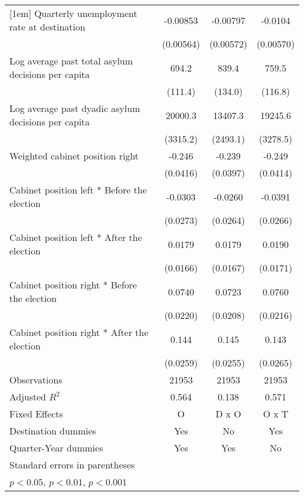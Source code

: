 \begin{table}[htbp]
\begin{tabular}{l*{3}{c}}
[1em]
Quarterly unemployment rate at destination&    -0.00853         &    -0.00797         &     -0.0104         \\
                    &   (0.00564)         &   (0.00572)         &   (0.00570)         \\
[1em]
Log average past total asylum decisions per capita&       694.2\sym{***}&       839.4\sym{***}&       759.5\sym{***}\\
                    &     (111.4)         &     (134.0)         &     (116.8)         \\
[1em]
Log average past dyadic asylum decisions per capita&     20000.3\sym{***}&     13407.3\sym{***}&     19245.6\sym{***}\\
                    &    (3315.2)         &    (2493.1)         &    (3278.5)         \\
[1em]
Weighted cabinet position right&      -0.246\sym{***}&      -0.239\sym{***}&      -0.249\sym{***}\\
                    &    (0.0416)         &    (0.0397)         &    (0.0414)         \\
[1em]
Cabinet position left * Before the election&     -0.0303         &     -0.0260         &     -0.0391         \\
                    &    (0.0273)         &    (0.0264)         &    (0.0266)         \\
[1em]
Cabinet position left * After the election&      0.0179         &      0.0179         &      0.0190         \\
                    &    (0.0166)         &    (0.0167)         &    (0.0171)         \\
[1em]
Cabinet position right * Before the election&      0.0740\sym{**} &      0.0723\sym{**} &      0.0760\sym{***}\\
                    &    (0.0220)         &    (0.0208)         &    (0.0216)         \\
[1em]
Cabinet position right * After the election&       0.144\sym{***}&       0.145\sym{***}&       0.143\sym{***}\\
                    &    (0.0259)         &    (0.0255)         &    (0.0265)         \\
\hline
Observations        &       21953         &       21953         &       21953         \\
Adjusted \(R^{2}\)  &       0.564         &       0.138         &       0.571         \\
Fixed Effects       &           O         &       D x O         &       O x T         \\
Destination dummies &         Yes         &          No         &         Yes         \\
Quarter-Year dummies&         Yes         &         Yes         &          No         \\
\hline\hline
\multicolumn{4}{l}{\footnotesize Standard errors in parentheses}\\
\multicolumn{4}{l}{\footnotesize \sym{*} \(p<0.05\), \sym{**} \(p<0.01\), \sym{***} \(p<0.001\)}\\
\end{tabular}
\end{table}
